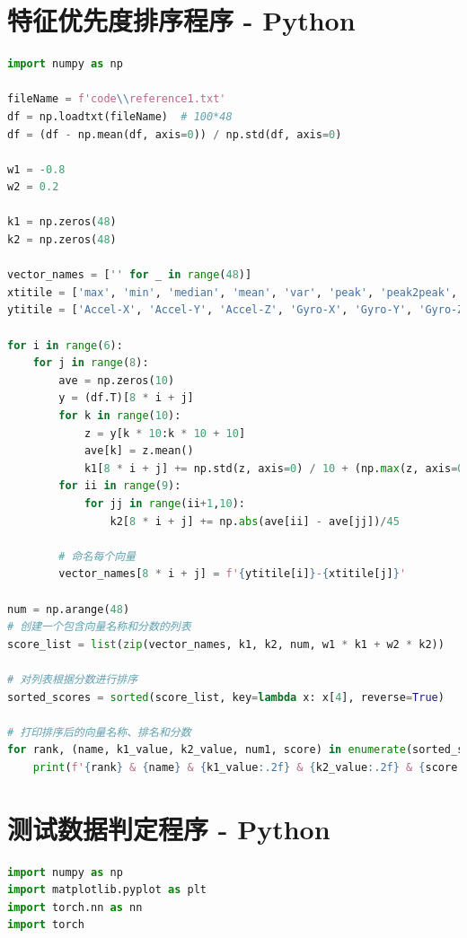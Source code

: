 \documentclass[withoutpreface]{cumcmthesis}
\begin{document}
\begin{appendices}
\section{特征优先度排序程序 - Python}

\begin{lstlisting}[language=python]
import numpy as np

fileName = f'code\\reference1.txt'
df = np.loadtxt(fileName)  # 100*48
df = (df - np.mean(df, axis=0)) / np.std(df, axis=0)

w1 = -0.8
w2 = 0.2

k1 = np.zeros(48)
k2 = np.zeros(48)

vector_names = ['' for _ in range(48)]
xtitile = ['max', 'min', 'median', 'mean', 'var', 'peak', 'peak2peak', 'rms']
ytitile = ['Accel-X', 'Accel-Y', 'Accel-Z', 'Gyro-X', 'Gyro-Y', 'Gyro-Z']

for i in range(6):
    for j in range(8):
        ave = np.zeros(10)
        y = (df.T)[8 * i + j]
        for k in range(10):
            z = y[k * 10:k * 10 + 10]
            ave[k] = z.mean()
            k1[8 * i + j] += np.std(z, axis=0) / 10 + (np.max(z, axis=0) - np.min(z, axis=0)) / 10
        for ii in range(9):
            for jj in range(ii+1,10):
                k2[8 * i + j] += np.abs(ave[ii] - ave[jj])/45

        # 命名每个向量
        vector_names[8 * i + j] = f'{ytitile[i]}-{xtitile[j]}'

num = np.arange(48)
# 创建一个包含向量名称和分数的列表
score_list = list(zip(vector_names, k1, k2, num, w1 * k1 + w2 * k2))

# 对列表根据分数进行排序
sorted_scores = sorted(score_list, key=lambda x: x[4], reverse=True)

# 打印排序后的向量名称、排名和分数
for rank, (name, k1_value, k2_value, num1, score) in enumerate(sorted_scores, start=1):
    print(f'{rank} & {name} & {k1_value:.2f} & {k2_value:.2f} & {score:.2f} \\\\ \\hline')
\end{lstlisting}

\section{测试数据判定程序 - Python}

\begin{lstlisting}[language=python]
import numpy as np
import matplotlib.pyplot as plt
import torch.nn as nn
import torch


\end{lstlisting}
\end{appendices}
\end{document}
